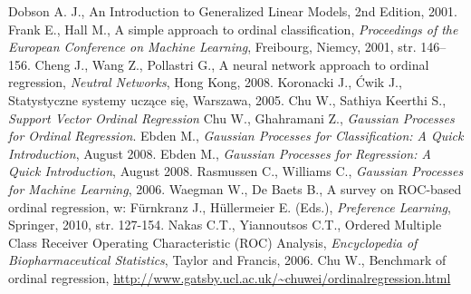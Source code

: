 \documentclass{mini}
\begin{document}
\begin{thebibliography}{9}
	 Dobson A. J., An Introduction to Generalized Linear Models, 2nd Edition, 2001.
	 Frank E., Hall M., A simple approach to ordinal classification, \emph{Proceedings of the European Conference on Machine Learning}, Freibourg, Niemcy, 2001, str. 146--156.
	 Cheng J., Wang Z., Pollastri G., A neural network approach to ordinal regression, \emph{Neutral Networks}, Hong Kong, 2008.
	 Koronacki J., Ćwik J., Statystyczne systemy uczące się, Warszawa, 2005. 
	 Chu W., Sathiya Keerthi S., \emph{Support Vector Ordinal Regression}
	 Chu W., Ghahramani Z., \emph{Gaussian Processes for Ordinal Regression}.
	 Ebden M., \emph{Gaussian Processes for Classification: A Quick Introduction}, August 2008.
	 Ebden M., \emph{Gaussian Processes for Regression: A Quick Introduction}, August 2008.
	 Rasmussen C., Williams C., \emph{Gaussian Processes for Machine Learning}, 2006.
	 Waegman W., De Baets B., A survey on ROC-based ordinal regression, w: Fürnkranz J., Hüllermeier E. (Eds.), \emph{Preference Learning}, Springer, 2010, str. 127-154.
	 Nakas C.T., Yiannoutsos C.T., Ordered Multiple Class Receiver Operating Characteristic (ROC) Analysis, \emph{Encyclopedia of Biopharmaceutical Statistics}, Taylor and Francis, 2006.
	 Chu W., Benchmark of ordinal regression, \url{http://www.gatsby.ucl.ac.uk/~chuwei/ordinalregression.html}
\end{thebibliography}


\makestatement
\end{document}
